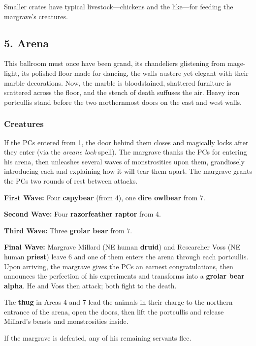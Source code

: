 \documentclass[10pt,a4paper,twoside,bg=print,twocolumn,openany,nodeprecatedcode]{dndbook}
\begin{document}
Smaller crates have typical livestock—chickens and the like—for feeding the margrave's creatures.

\subsection{5. Arena}
\begin{DndReadAloud}{}
This ballroom must once have been grand, its chandeliers glistening from mage-light, its polished floor made for dancing, the walls austere yet elegant with their marble decorations. Now, the marble is bloodstained, shattered furniture is scattered across the floor, and the stench of death suffuses the air. Heavy iron portcullis stand before the two northernmost doors on the east and west walls.

\end{DndReadAloud}

\subsubsection{Creatures}
If the PCs entered from 1, the door behind them closes and magically locks after they enter (via the \textit{arcane lock} spell). The margrave thanks the PCs for entering his arena, then unleashes several waves of monstrosities upon them, grandiosely introducing each and explaining how it will tear them apart. The margrave grants the PCs two rounds of rest between attacks.

\textbf{First Wave:} Four \textbf{capybear} (from 4), one \textbf{dire owlbear} from 7.

\textbf{Second Wave:} Four \textbf{razorfeather raptor} from 4.

\textbf{Third Wave:} Three \textbf{grolar bear} from 7.

\textbf{Final Wave:} Margrave Millard (NE human \textbf{druid}) and Researcher Voss (NE human \textbf{priest}) leave 6 and one of them enters the arena through each portcullis. Upon arriving, the margrave gives the PCs an earnest congratulations, then announces the perfection of his experiments and transforms into a \textbf{grolar bear alpha}. He and Voss then attack; both fight to the death.

The \textbf{thug} in Areas 4 and 7 lead the animals in their charge to the northern entrance of the arena, open the doors, then lift the portcullis and release Millard's beasts and monstrosities inside.

If the margrave is defeated, any of his remaining servants flee.
\end{document}
